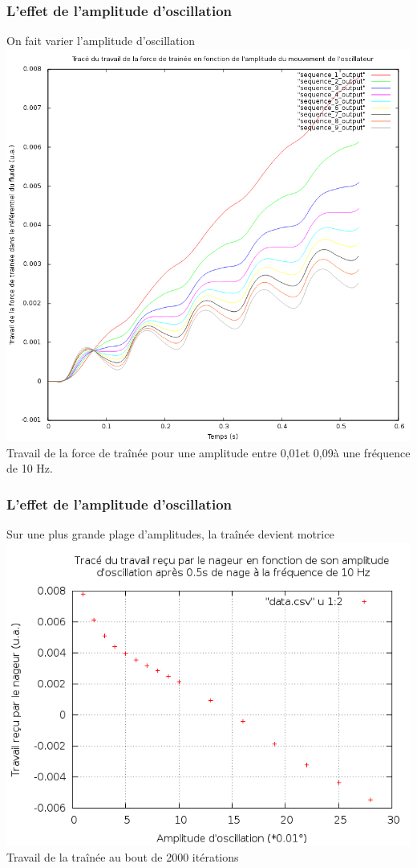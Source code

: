 \documentclass{beamer}
\begin{document}
 	\begin{frame}
 		\frametitle{L'effet de l'amplitude d'oscillation}
 			On fait varier l'amplitude d'oscillation
			\centering \includegraphics[height= 0.6 \textheight]{9courbes.png}\\
 			Travail de la force de traînée pour une amplitude entre 0,01\degre et 0,09\degre à une fréquence de 10 Hz.
 	\end{frame}
 	
 	\begin{frame}
 		\frametitle{L'effet de l'amplitude d'oscillation}
 		Sur une plus grande plage d'amplitudes, la traînée devient motrice
 		\centering \includegraphics[width= 0.8 \linewidth]{bcp_points.png}\\
 		Travail de la traînée au bout de 2000 itérations
 	\end{frame}
  
\end{document}
